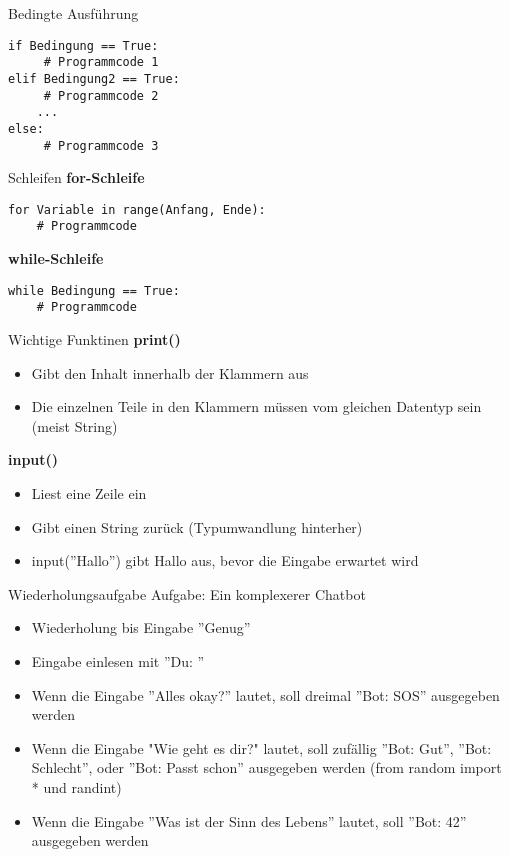 \begin{frame}[fragile]{Bedingte Ausführung}
	\begin{lstlisting}
if Bedingung == True:
     # Programmcode 1
elif Bedingung2 == True:
     # Programmcode 2
	...
else:
     # Programmcode 3
	\end{lstlisting}
\end{frame}

\begin{frame}[fragile]{Schleifen}
\textbf{for-Schleife}
\begin{lstlisting}
for Variable in range(Anfang, Ende):
	# Programmcode
\end{lstlisting}

\textbf{while-Schleife}
\begin{lstlisting}
while Bedingung == True:
	# Programmcode
\end{lstlisting}
\end{frame}

\begin{frame}[fragile]{Wichtige Funktinen}
\textbf{print()}
\begin{itemize}
	\item Gibt den Inhalt innerhalb der Klammern aus
	\item Die einzelnen Teile in den Klammern müssen vom gleichen Datentyp sein (meist String)
\end{itemize}

\textbf{input()}
\begin{itemize}
	\item Liest eine Zeile ein
	\item Gibt einen String zurück (Typumwandlung hinterher)
	\item input(''Hallo'') gibt Hallo aus, bevor die Eingabe erwartet wird
\end{itemize}
\end{frame}


\begin{frame}[fragile]{Wiederholungsaufgabe}
	Aufgabe: Ein komplexerer Chatbot\\
	\begin{itemize}
		\item Wiederholung bis Eingabe ''Genug''
		\item Eingabe einlesen mit ''Du: ''
		\item Wenn die Eingabe ''Alles okay?'' lautet, soll dreimal ''Bot: SOS'' ausgegeben werden
		\item Wenn die Eingabe "Wie geht es dir?" lautet, soll zufällig ''Bot: Gut'', ''Bot: Schlecht'', oder ''Bot: Passt schon'' ausgegeben werden (from random import *  und randint)
		\item Wenn die Eingabe ''Was ist der Sinn des Lebens'' lautet, soll ''Bot: 42'' ausgegeben werden
	\end{itemize}
	
\end{frame}

